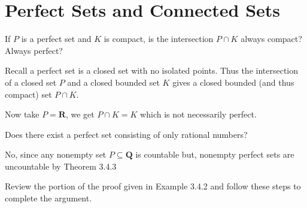 \section{Perfect Sets and Connected Sets}

\begin{exercise}
  If $P$ is a perfect set and $K$ is compact, is the intersection $P \cap K$ always compact? Always perfect?
\end{exercise}

\begin{solution}
  Recall a perfect set is a closed set with no isolated points. Thus the intersection of a closed set $P$ and a closed bounded set $K$ gives a closed bounded (and thus compact) set $P \cap K$.

  Now take $P = \mathbf{R}$, we get $P \cap K = K$ which is not necessarily perfect.
\end{solution}

\begin{exercise}
  Does there exist a perfect set consisting of only rational numbers?
\end{exercise}

\begin{solution}
  No, since any nonempty set $P \subseteq \mathbf Q$ is countable but, nonempty perfect sets are uncountable by Theorem 3.4.3
\end{solution}

\begin{exercise}
  Review the portion of the proof given in Example 3.4.2 and follow these steps to complete the argument.
\end{exercise}

\begin{solution}
\end{solution}

